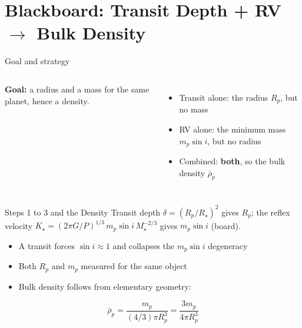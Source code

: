 \documentclass[aspectratio=169, 11pt]{beamer}
\begin{document}
\section{Blackboard: Transit Depth + RV $\to$ Bulk Density}

\begin{frame}{Goal and strategy}
  \begin{columns}[c]
    \column{\recapfigcolnarrow}
    \column{\recaptextcolwide}
    \textbf{Goal:} a radius and a mass for the same planet, hence a density.
    \vskip8pt
    \begin{itemize}\setlength\itemsep{2pt}
      \item Transit alone: the radius $R_p$, but no mass
      \item RV alone: the minimum mass $m_p \sin i$, but no radius
      \item Combined: \textbf{both}, so the bulk density $\bar\rho_p$
    \end{itemize}
    \vskip8pt
  \end{columns}
\end{frame}

\begin{frame}{Steps 1 to 3 and the Density}
  Transit depth $\delta = (R_p/R_\star)^2$ gives $R_p$; the reflex velocity $K_\star = (2\pi G/P)^{1/3}\, m_p \sin i\, M_\star^{-2/3}$ gives $m_p \sin i$ (board).
  \begin{itemize}\setlength\itemsep{2pt}
    \item A transit forces $\sin i \approx 1$ and collapses the $m_p \sin i$ degeneracy
    \item Both $R_p$ and $m_p$ measured for the same object
    \item Bulk density follows from elementary geometry:
  \end{itemize}
  \[
    \boxed{\; \bar\rho_p = \frac{m_p}{(4/3)\pi R_p^3} = \frac{3 m_p}{4\pi R_p^3} \;}
  \]
  \vskip4pt
\end{frame}
\end{document}
